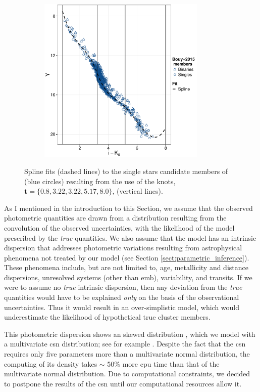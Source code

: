 \begin{figure}[ht!]
\begin{subfigure}[t]{0.48\textwidth}
    \end{subfigure}
     \begin{subfigure}[t]{0.48\textwidth}
      \includegraphics[page=7,height=8cm,width=\textwidth]{background/Figures/Photometry_fit.pdf}
        \caption{}
         
    \end{subfigure}
\caption{Spline fits (dashed lines) to the single stars candidate members of \citet{Bouy2015} (blue circles) resulting from the use of the knots, $\mathbf{t}=\{0.8,3.22,3.22,5.17,8.0\}$, (vertical lines).}
\label{fig:fitCMDs}
\end{figure}

As I mentioned in the introduction to this Section, we assume that the observed photometric quantities are drawn from a distribution resulting from the convolution of the observed uncertainties, with the likelihood of the model prescribed by the \emph{true} quantities. We also assume that the model has an intrinsic dispersion that addresses photometric variations resulting from astrophysical phenomena not treated by our model (see Section \ref{sect:parametric_inference}). These phenomena include, but are not limited to, age, metallicity and distance dispersions, unresolved systems (other than \gls{emb}), variability, and transits. If we were to assume no \emph{true} intrinsic dispersion, then any deviation from the \emph{true} quantities would have to be explained \emph{only} on the basis of the observational uncertainties. Thus it would result in an over-simplistic model, which would underestimate the likelihood of hypothetical true cluster members. 

This photometric dispersion shows an skewed distribution \cite[see Figure 2 of][which I reproduce in Fig. \ref{fig:luminosity_dispersion}]{2008ASPC..384..200H}, which we model with a multivariate \gls{csn} distribution; see for example \citet{Gonzalez-Farias2004,Gupta2004}. Despite the fact that the \gls{csn} requires only five parameters more than a multivariate normal distribution, the computing of its density takes $\sim$ 50\% more \gls{cpu} time than that of the multivariate normal distribution. Due to computational constraints, we decided to postpone the results of the \gls{csn} until our computational resources allow it. 

